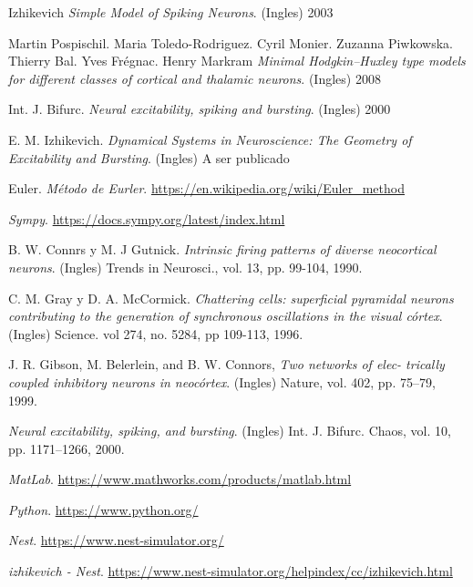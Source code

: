 \documentclass[12pt]{article}
\begin{document}
\begin{thebibliography}{9}

Izhikevich
\textit{Simple Model of Spiking Neurons}. (Ingles) 2003

Martin Pospischil. Maria Toledo-Rodriguez. Cyril Monier. Zuzanna Piwkowska. Thierry Bal. Yves Frégnac. Henry Markram
\textit{Minimal Hodgkin–Huxley type models for different classes of cortical and thalamic neurons}. (Ingles) 2008

Int. J. Bifurc.
\textit{Neural excitability, spiking and bursting}. (Ingles) 2000

E. M. Izhikevich.
\textit{Dynamical Systems in Neuroscience: The Geometry of Excitability and Bursting}. (Ingles) A ser publicado

Euler.
\textit{Método de Eurler}. \url{https://en.wikipedia.org/wiki/Euler_method}

\textit{Sympy}. \url{https://docs.sympy.org/latest/index.html}

B. W. Connrs y M. J Gutnick.
\textit{Intrinsic firing patterns of diverse neocortical neurons}. (Ingles) Trends in Neurosci., vol. 13, pp. 99-104, 1990.

C. M. Gray y D. A. McCormick.
\textit{Chattering cells: superficial pyramidal neurons contributing to the generation of synchronous oscillations in the visual córtex}. (Ingles) Science. vol 274, no. 5284, pp 109-113, 1996.

J. R. Gibson, M. Belerlein, and B. W. Connors,
\textit{Two networks of elec- trically coupled inhibitory neurons in neocórtex}. (Ingles) Nature, vol. 402, pp. 75–79, 1999.

\textit{Neural excitability, spiking, and bursting}. (Ingles) Int. J. Bifurc. Chaos, vol. 10, pp. 1171–1266, 2000.

\textit{MatLab}. \url{https://www.mathworks.com/products/matlab.html}

\textit{Python}. \url{https://www.python.org/}

\textit{Nest}. \url{https://www.nest-simulator.org/}

\textit{izhikevich - Nest}. \url{https://www.nest-simulator.org/helpindex/cc/izhikevich.html}

\end{thebibliography}
\end{document}
